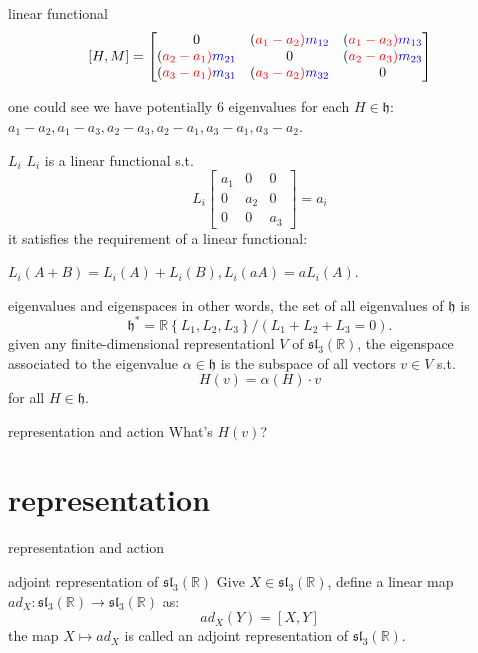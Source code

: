 \documentclass{beamer}
\newcommand{\R}{\mathbb{R}}
\begin{document}
\begin{frame}{linear functional}	
	\[ [H,M] = \def\a{\color{red}a} \def\m{\color{blue}m} \begin{bmatrix} 0& (\a_1-\a_2)\m_{12} & (\a_1-\a_3)\m_{13} \\ (\a_2-\a_1)\m_{21} & 0& (\a_2-\a_3)\m_{23} \\ (\a_3-\a_1)\m_{31} & (\a_3-\a_2)\m_{32} & 0 \end{bmatrix} \]

	one could see we have potentially $6$ eigenvalues for each  $H \in \mathfrak{h}$: $a_1-a_2, a_1-a_3, a_2-a_3, a_2-a_1, a_3-a_1, a_3-a_2$. 

	\begin{defn}{$L_i$}{}
	$L_i$ is a linear functional s.t. \[
		L_i \begin{bmatrix} a_1 & 0 &0 \\ 0 & a_2 & 0 \\ 0 &0 &a_3 \end{bmatrix} = a_i 
	\] it satisfies the requirement of a linear functional: 

	$L_i(A+B) = L_i(A) + L_i(B), L_i(aA) = aL_i(A)$.
	\end{defn}
\end{frame}

\begin{frame}{eigenvalues and eigenspaces}
	in other words, the set of all eigenvalues of $\mathfrak{h}$ is  \[
		\mathfrak{h}^* = \R \left\{ L_1,L_2,L_3 \right\} / (L_1+L_2+L_3=0). 
	\] given any finite-dimensional representationl $V$ of  $\mathfrak{sl}_3(\R)$, the eigenspace associated to the eigenvalue $\alpha \in \mathfrak{h}$ is the subspace of all vectors $v \in V$ s.t. \[
	H(v) = \alpha(H) \cdot v
\] for all $H \in \mathfrak{h}$.
\end{frame}

\begin{frame}{representation and action}
	What's $H(v)$?
\end{frame}

\section{representation}

\begin{frame}{representation and action}
	
	\begin{defn}{adjoint representation of $\mathfrak{sl}_3(\R)$}{}
		Give $X \in \mathfrak{sl}_3(\R)$, define a linear map $ad_X : \mathfrak{sl}_3(\R) \to \mathfrak{sl}_3(\R)$ as: \[
			ad_X(Y) = [X,Y]
		\] the map $X \mapsto ad_X$ is called an adjoint representation of $\mathfrak{sl}_3(\R)$.
	\end{defn}
\end{frame}
\end{document}
